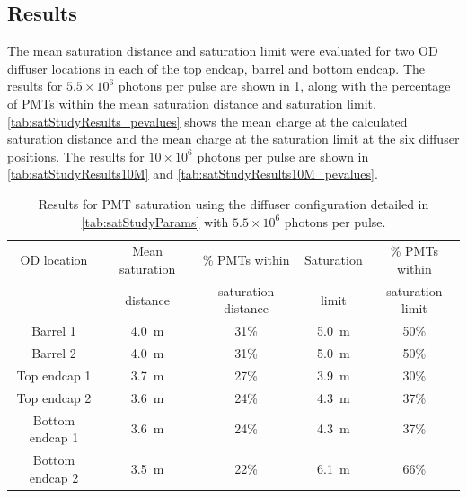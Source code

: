 \documentclass[a4paper,11pt]{article}
\begin{document}
\subsection{Results}\label{subsec:satResults}

The mean saturation distance and saturation limit were evaluated for two OD diffuser locations in each of the top endcap, barrel and bottom endcap. The results for $5.5\times10^6$ photons per pulse are shown in \cref{tab:satStudyResults}, along with the percentage of PMTs within the mean saturation distance and saturation limit. \cref{tab:satStudyResults_pevalues} shows the mean charge at the calculated saturation distance and the mean charge at the saturation limit at the six diffuser positions. The results for $10\times10^6$ photons per pulse are shown in \cref{tab:satStudyResults10M} and \cref{tab:satStudyResults10M_pevalues}.
\begin{table}[ht!]
    \centering
    \begin{tabular}{|c|c|c|c|c|}
    \hline
        OD location & Mean saturation & \% PMTs within & Saturation  & \% PMTs within \\
                    &  distance & saturation distance & limit &  saturation limit\\
        \hline
        Barrel 1        & 4.0~m & 31\%        & 5.0~m   & 50\% \\
        Barrel 2        & 4.0~m    & 31\%     & 5.0~m   & 50\% \\
		Top endcap 1    & 3.7~m  & 27\%       & 3.9~m & 30\% \\
        Top endcap 2    & 3.6~m  & 24\%       & 4.3~m & 37\% \\ 
		Bottom endcap 1 & 3.6~m  & 24\%       & 4.3~m & 37\% \\
		Bottom endcap 2 & 3.5~m  & 22\%       & 6.1~m & 66\% \\
        \hline
    \end{tabular}
    \caption{Results for PMT saturation using the diffuser configuration detailed in \cref{tab:satStudyParams} with $5.5\times10^6$ photons per pulse.}
    \label{tab:satStudyResults}
\end{table}
%
\end{document}

